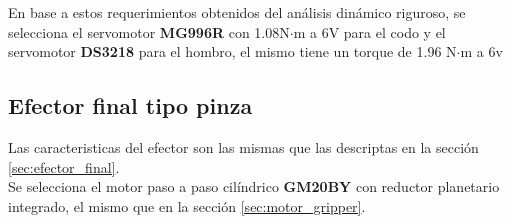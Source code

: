 En base a estos requerimientos obtenidos del análisis dinámico riguroso, se selecciona el servomotor \textbf{MG996R} con 1.08N$\cdot$m a 6V para el codo y el servomotor \textbf{DS3218} para el hombro, el mismo tiene un torque de 1.96 N$\cdot$m a 6v

\subsection{Efector final tipo pinza}

Las caracteristicas del efector son las mismas que las descriptas en la sección \ref{sec:efector_final}.\\

Se selecciona el motor paso a paso cilíndrico \textbf{GM20BY} con reductor planetario integrado, el mismo que en la sección \ref{sec:motor_gripper}.